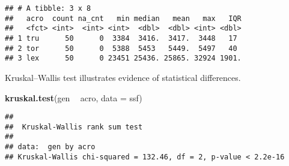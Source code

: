 \documentclass[]{book}
\newenvironment{Shaded}{\begin{snugshade}}{\end{snugshade}}
\newcommand{\DataTypeTok}[1]{\textcolor[rgb]{0.13,0.29,0.53}{#1}}
\newcommand{\KeywordTok}[1]{\textcolor[rgb]{0.13,0.29,0.53}{\textbf{#1}}}
\newcommand{\NormalTok}[1]{#1}
\newcommand{\OperatorTok}[1]{\textcolor[rgb]{0.81,0.36,0.00}{\textbf{#1}}}
\newcommand{\OtherTok}[1]{\textcolor[rgb]{0.56,0.35,0.01}{#1}}
\newcommand{\StringTok}[1]{\textcolor[rgb]{0.31,0.60,0.02}{#1}}
\begin{document}
\begin{Shaded}
\end{Shaded}

\begin{verbatim}
## # A tibble: 3 x 8
##   acro  count na_cnt   min median   mean   max   IQR
##   <fct> <int>  <int> <int>  <dbl>  <dbl> <int> <dbl>
## 1 tru      50      0  3384  3416.  3417.  3448   17 
## 2 tor      50      0  5388  5453   5449.  5497   40 
## 3 lex      50      0 23451 25436. 25865. 32924 1901.
\end{verbatim}

Kruskal--Wallis test illustrates evidence of statistical differences.

\begin{Shaded}
\begin{Highlighting}[]
\KeywordTok{kruskal.test}\NormalTok{(gen }\OperatorTok{~}\StringTok{ }\NormalTok{acro, }\DataTypeTok{data =}\NormalTok{ ssf)}
\end{Highlighting}
\end{Shaded}

\begin{verbatim}
## 
##  Kruskal-Wallis rank sum test
## 
## data:  gen by acro
## Kruskal-Wallis chi-squared = 132.46, df = 2, p-value < 2.2e-16
\end{verbatim}
\end{document}
